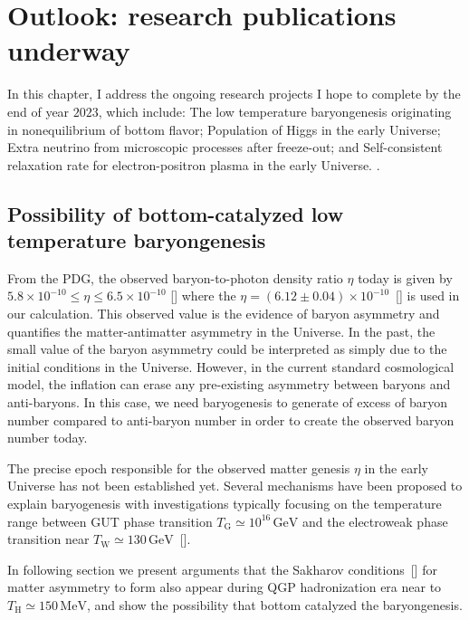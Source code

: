 \chapter{{Outlook: research publications underway}}\label{Outlook}
In this chapter, I address the ongoing research projects I hope to complete by the end of year $2023$, which include: The low temperature baryongenesis originating in nonequilibrium of bottom flavor; Population of Higgs in the early Universe; Extra neutrino from microscopic processes after freeze-out; and Self-consistent relaxation rate for electron-positron plasma in the early Universe.%
.

\section{{Possibility of bottom-catalyzed low temperature baryongenesis}}
From the PDG, the observed baryon-to-photon density ratio $\eta$ today is given by  $5.8\times10^{-10} \leqslant\eta\leqslant6.5\times10^{-10}$ [\cite{ParticleDataGroup:2018ovx}] where the $\eta=(6.12\pm0.04)\times10^{-10}$~[\cite{ParticleDataGroup:2022pth}] is used in our calculation. This observed value is the evidence of baryon asymmetry and quantifies the matter-antimatter asymmetry in the Universe. In the past, the small value of the baryon asymmetry could be interpreted as simply due to the initial conditions in the Universe. However, in the current standard cosmological model, the inflation can erase any pre-existing asymmetry between baryons and anti-baryons. In this case, we need baryogenesis to generate of excess of baryon number compared to anti-baryon number in order to create the observed baryon number today.

The precise epoch responsible for the observed matter genesis $\eta$  in the early Universe has not been established yet. 
Several mechanisms have been proposed to explain baryogenesis with investigations typically focusing on the temperature range between GUT phase transition $T_\mathrm{G}\simeq10^{16}\,\mathrm{GeV}$ and the electroweak phase transition near $T_\mathrm{W}\simeq130\,\mathrm{GeV}$~[\cite{Kuzmin:1985mm,Kuzmin:1987wn,Arnold:1987mh,Kolb:1996jt,Riotto:1999yt,Nielsen:2001fy,Giudice:2003jh,Davidson:2008bu,Morrissey:2012db}].

In following section we present arguments that the Sakharov conditions~[\cite{Sakharov:1967dj}] for matter asymmetry to form also appear during QGP hadronization era near to $T_\mathrm{H}\simeq150\,\mathrm{MeV}$, and show the possibility that bottom catalyzed the baryongenesis.

